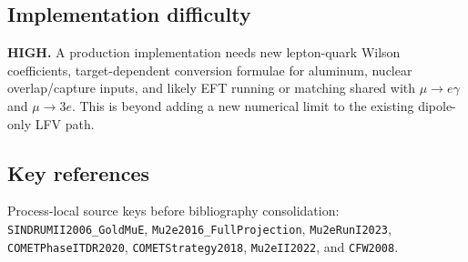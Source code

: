 \subsection*{Implementation difficulty}
\textbf{HIGH.}  A production implementation needs new lepton-quark Wilson
coefficients, target-dependent conversion formulae for aluminum, nuclear
overlap/capture inputs, and likely EFT running or matching shared with
\(\mu\to e\gamma\) and \(\mu\to3e\).  This is beyond adding a new numerical
limit to the existing dipole-only LFV path.

\subsection*{Key references}
Process-local source keys before bibliography consolidation:
\texttt{SINDRUMII2006\_GoldMuE}, \texttt{Mu2e2016\_FullProjection},
\texttt{Mu2eRunI2023}, \texttt{COMETPhaseITDR2020},
\texttt{COMETStrategy2018}, \texttt{Mu2eII2022}, and \texttt{CFW2008}.
